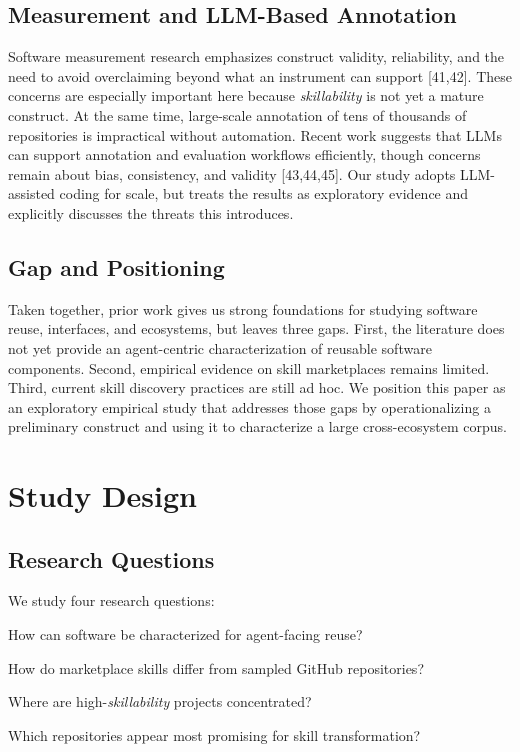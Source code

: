 \documentclass[sigconf,review,anonymous,nonacm]{acmart}
\newcommand{\skillability}{\textit{skillability}\xspace}
\begin{document}
\subsection{Measurement and LLM-Based Annotation}

Software measurement research emphasizes construct validity, reliability, and the need to avoid overclaiming beyond what an instrument can support [41,42]. These concerns are especially important here because \skillability is not yet a mature construct. At the same time, large-scale annotation of tens of thousands of repositories is impractical without automation. Recent work suggests that LLMs can support annotation and evaluation workflows efficiently, though concerns remain about bias, consistency, and validity [43,44,45]. Our study adopts LLM-assisted coding for scale, but treats the results as exploratory evidence and explicitly discusses the threats this introduces.

\subsection{Gap and Positioning}

Taken together, prior work gives us strong foundations for studying software reuse, interfaces, and ecosystems, but leaves three gaps. First, the literature does not yet provide an agent-centric characterization of reusable software components. Second, empirical evidence on skill marketplaces remains limited. Third, current skill discovery practices are still ad hoc. We position this paper as an exploratory empirical study that addresses those gaps by operationalizing a preliminary construct and using it to characterize a large cross-ecosystem corpus.

\section{Study Design}

\subsection{Research Questions}

We study four research questions:
\begin{description}[leftmargin=0.5cm,style=nextline]
    \item[RQ1.] How can software be characterized for agent-facing reuse?
    \item[RQ2.] How do marketplace skills differ from sampled GitHub repositories?
    \item[RQ3.] Where are high-\skillability projects concentrated?
    \item[RQ4.] Which repositories appear most promising for skill transformation?
\end{description}
\end{document}
